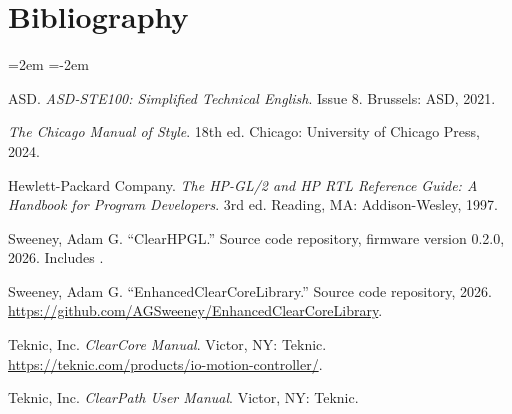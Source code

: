 \chapter{Bibliography}

\begin{list}{}{\leftmargin=2em \itemindent=-2em \itemsep=6pt \parsep=0pt}
\raggedright

\item ASD. \textit{ASD-STE100: Simplified Technical English}. Issue 8.
Brussels: ASD, 2021.

\item \textit{The Chicago Manual of Style}. 18th ed. Chicago: University of
Chicago Press, 2024.

\item Hewlett-Packard Company. \textit{The HP-GL/2 and HP RTL Reference Guide:
A Handbook for Program Developers}. 3rd ed. Reading, MA: Addison-Wesley, 1997.

\item Sweeney, Adam G. ``ClearHPGL.'' Source code repository, firmware
version 0.2.0, 2026. Includes .

\item Sweeney, Adam G. ``EnhancedClearCoreLibrary.'' Source code repository,
2026. \url{https://github.com/AGSweeney/EnhancedClearCoreLibrary}.

\item Teknic, Inc. \textit{ClearCore Manual}. Victor, NY: Teknic.
\url{https://teknic.com/products/io-motion-controller/}.

\item Teknic, Inc. \textit{ClearPath User Manual}. Victor, NY: Teknic.

\end{list}
